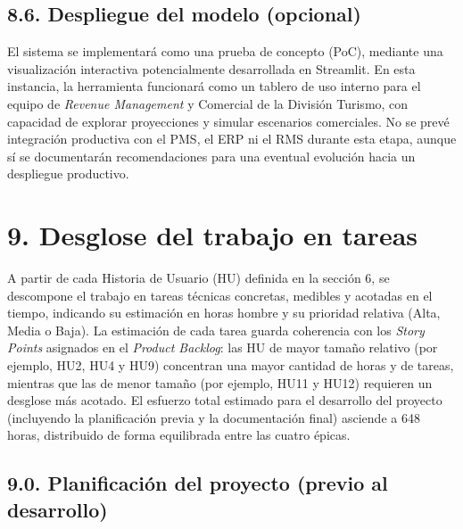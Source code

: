 \documentclass[
11pt, %
]{charter}
\begin{document}
\subsection*{8.6. Despliegue del modelo (opcional)}
El sistema se implementará como una prueba de concepto (PoC), mediante una visualización interactiva potencialmente desarrollada en Streamlit. En esta instancia, la herramienta funcionará como un tablero de uso interno para el equipo de \textit{Revenue Management} y Comercial de la División Turismo, con capacidad de explorar proyecciones y simular escenarios comerciales. No se prevé integración productiva con el PMS, el ERP ni el RMS durante esta etapa, aunque sí se documentarán recomendaciones para una eventual evolución hacia un despliegue productivo.

\section{9. Desglose del trabajo en tareas}
\label{sec:wbs}
 
A partir de cada Historia de Usuario (HU) definida en la sección 6, se descompone el trabajo en tareas técnicas concretas, medibles y acotadas en el tiempo, indicando su estimación en horas hombre y su prioridad relativa (Alta, Media o Baja). La estimación de cada tarea guarda coherencia con los \textit{Story Points} asignados en el \textit{Product Backlog}: las HU de mayor tamaño relativo (por ejemplo, HU2, HU4 y HU9) concentran una mayor cantidad de horas y de tareas, mientras que las de menor tamaño (por ejemplo, HU11 y HU12) requieren un desglose más acotado. El esfuerzo total estimado para el desarrollo del proyecto (incluyendo la planificación previa y la documentación final) asciende a 648 horas, distribuido de forma equilibrada entre las cuatro épicas.

\subsection*{9.0. Planificación del proyecto (previo al desarrollo)}
 
\end{document}
